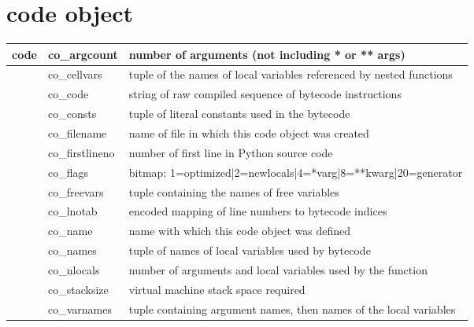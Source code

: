 \documentclass{icldt}
\numberwithin{equation}{section}       %
\newcommand{\blankpage}{
\newpage
\thispagestyle{empty}
\mbox{}
\newpage
}
\begin{document}
{{\section{code object}
\begin{tabularx}{\textwidth}{ |l|l|l| }
	\hline
	code & co_argcount & number of arguments (not including * or ** args) \\
	\hline
	& co_cellvars & tuple of the names of local variables referenced by nested functions \\
	\hline
	& co_code & string of raw compiled sequence of bytecode instructions \\
	\hline
	& co_consts & tuple of literal constants used in the bytecode \\
	\hline
	& co_filename & name of file in which this code object was created \\
	\hline
	& co_firstlineno & number of first line in Python source code \\
	\hline
	& co_flags & bitmap: 1=optimized|2=newlocals|4=*varg|8=**kwarg|20=generator \\
	\hline
	& co_freevars & tuple containing the names of free variables \\
	\hline
	& co_lnotab & encoded mapping of line numbers to bytecode indices \\
	\hline
	& co_name & name with which this code object was defined \\
	\hline
	& co_names & tuple of names of local variables used by bytecode \\
	\hline
	& co_nlocals & number of arguments and local variables used by the function \\
	\hline
	& co_stacksize & virtual machine stack space required \\
	\hline
	& co_varnames & tuple containing argument names, then names of the local variables \\
	\hline
\end{tabularx}

\blankpage
}}
\end{document}
